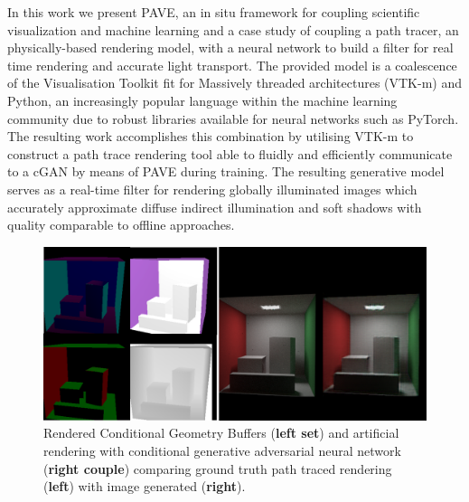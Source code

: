 In this work we present PAVE, an in situ framework for coupling scientific visualization and machine learning and a case study of coupling a path tracer, an physically-based rendering model, with a neural network to build a filter for real time rendering and accurate light transport. The provided model is a coalescence of the Visualisation Toolkit fit for Massively threaded architectures (VTK-m) and Python, an increasingly popular language within the machine learning community due to robust libraries available for neural networks such as PyTorch. The resulting work accomplishes this combination by utilising VTK-m to construct a path trace rendering tool able to fluidly and efficiently communicate to a cGAN by means of PAVE during training.   The resulting generative model serves as a real-time filter for rendering globally illuminated images which accurately approximate diffuse indirect illumination and soft shadows with quality comparable to offline approaches. 

\begin{figure}
    \includegraphics[width=\linewidth]{Teaser.png}
    \caption{Rendered Conditional Geometry Buffers ({\bf left set}) and artificial rendering with conditional generative adversarial neural network ({\bf right couple}) comparing ground truth path traced rendering ({\bf left}) with image generated ({\bf right}).}
    \label{teaser}
  \end{figure}
